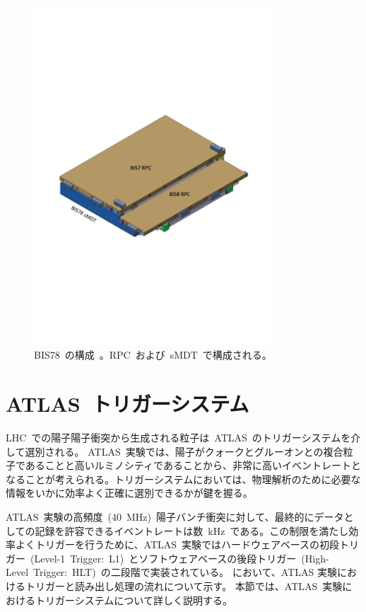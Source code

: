 \begin{figure}[H]
        \centering   
        \includegraphics[width=0.8\textwidth,page=1]{img/pdf/bis.pdf}
        \caption[RPC~BIS78~の構成]{BIS78~の構成~\cite{TR:04}。RPC~および~sMDT~で構成される。}
        \label{fig:bis}
\end{figure}

\section{ATLAS~トリガーシステム}\label{sec:ttri}
LHC~での陽子陽子衝突から生成される粒子は~ATLAS~のトリガーシステムを介して選別される。
ATLAS~実験では、陽子がクォークとグルーオンとの複合粒子であることと高いルミノシティであることから、非常に高いイベントレートとなることが考えられる。トリガーシステムにおいては、物理解析のために必要な情報をいかに効率よく正確に選別できるかが鍵を握る。

ATLAS~実験の高頻度~(40~MHz)~陽子バンチ衝突に対して、最終的にデータとしての記録を許容できるイベントレートは数~kHz~である。この制限を満たし効率よくトリガーを行うために、ATLAS~実験ではハードウェアベースの初段トリガー~(Level-1~Trigger:~L1)~とソフトウェアベースの後段トリガー~(High-Level~Trigger:~HLT)~の二段階で実装されている。
において、ATLAS 実験におけるトリガーと読み出し処理の流れについて示す。
本節では、ATLAS~実験におけるトリガーシステムについて詳しく説明する。


